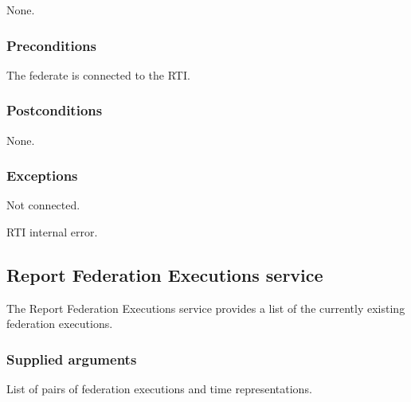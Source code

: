 \begin{compactstdpage}
    \begin{stdalphalist}
        \item None.
    \end{stdalphalist}

    \subsubsection{Preconditions}

    \begin{stdalphalist}
        \item The federate is connected to the RTI.
    \end{stdalphalist}

    \subsubsection{Postconditions}

    \begin{stdalphalist}
        \item None.
    \end{stdalphalist}

    \subsubsection{Exceptions}

    \begin{stdalphalist}
        \item Not connected.
        \item RTI internal error.
    \end{stdalphalist}

    \subsection{Report Federation Executions \rtiinitiated{} service}

    The Report Federation Executions \rtiinitiated{} service provides a list of the currently existing federation executions.

    \subsubsection{Supplied arguments}

    \begin{stdalphalist}
        \item List of pairs of federation executions and time representations.
    \end{stdalphalist}


\end{compactstdpage}
